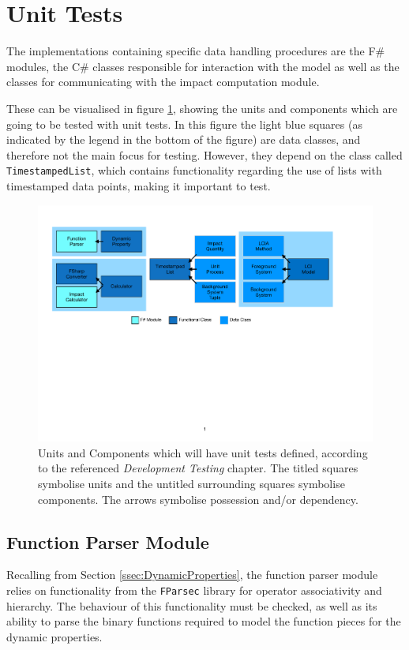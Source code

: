 \section{Unit Tests} \label{sec:Testing-UnitTesting}
The implementations containing specific data handling procedures are the F\# modules, the C\# classes responsible for interaction with the model as well as the classes for communicating with the impact computation module.

These can be visualised in figure \ref{fig:TestingGroups}, showing the units and components which are going to be tested with unit tests. In this figure the light blue squares (as indicated by the legend in the bottom of the figure) are data classes, and therefore not the main focus for testing. 
However, they depend on the class called \texttt{TimestampedList}, which contains functionality regarding the use of lists with timestamped data points, making it important to test.

\begin{figure}[H]
    \centering
    \includegraphics[page=1, width=\linewidth]{.Figures/TestingGroups.pdf}
    \caption{Units and Components which will have unit tests defined, according to the referenced \textit{Development Testing} chapter\cite{SoftwareEngineering}. The titled squares symbolise units and the untitled surrounding squares symbolise components. The arrows symbolise possession and/or dependency.}
    \label{fig:TestingGroups}
\end{figure}

\subsection{Function Parser Module} \label{ssec:Testing-FunctionParserModule}
Recalling from Section \ref{ssec:DynamicProperties}, the function parser module relies on functionality from the \texttt{FParsec} library for operator associativity and hierarchy. The behaviour of this functionality must be checked, as well as its ability to parse the binary functions required to model the function pieces for the dynamic properties.

